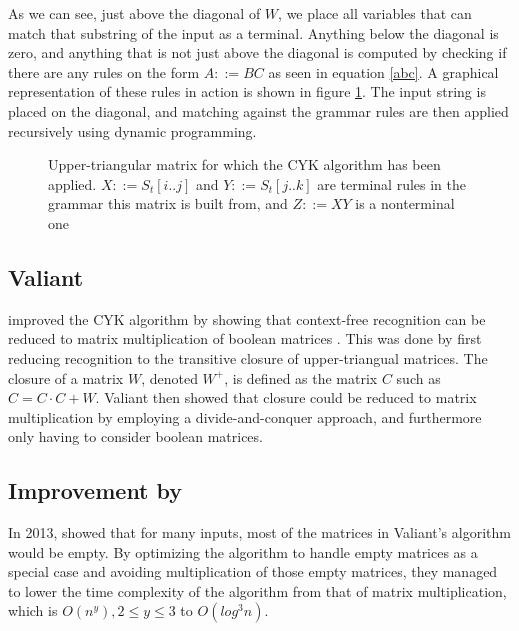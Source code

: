 \documentclass[a4paper,12pt,twosided]{report}
\renewcommand\cite{\citep}
\newcommand{\subt}[3] { 
  \draw[grid] (#1,#1) -- (#1,#2) node[inChart] {#3} -- (#2,#2);
  \fill[color=black] (#1,#2) circle (2pt)
 }
\newcommand{\mrk}[2]{\node[inChart] at (#1,#1) {#2}}
\begin{document}
As we can see, just above the diagonal of $W$, we place all variables that can
match that substring of the input as a terminal. Anything below the diagonal is
zero, and anything that is not just above the diagonal is computed by checking
if there are any rules on the form $A ::= BC$ as seen in equation \ref{abc}. A
graphical representation of these rules in action is shown in figure
\ref{exchart}. The input string is placed on the diagonal, and matching against
the grammar rules are then applied recursively using dynamic programming. 

\begin{figure}[H]
  \centering
  \caption{\label{exchart}Upper-triangular matrix for which the CYK algorithm
           has been applied. $X ::= S_t[i..j]$ and $Y ::= S_t[j..k]$ are
           terminal rules in the grammar this matrix is built from, and $Z
           ::= XY$ is a nonterminal one} 
\end{figure}

\subsection{Valiant}
\citet{Valiant75} improved the CYK algorithm by showing that
context-free recognition can be reduced to matrix multiplication of boolean
matrices \cite{Valiant75}. This was done by first reducing recognition to the
transitive closure of upper-triangual matrices.  The closure of a matrix $W$,
denoted $W^+$, is defined as the matrix $C$ such as $C = C \cdot C + W$.
Valiant then showed that closure could be reduced to matrix multiplication by
employing a divide-and-conquer approach, and furthermore only having to consider
boolean matrices. 

\subsection{Improvement by \citeauthor{parparsepaper}}
In 2013, \citet{parparsepaper} showed that for many inputs, most of the matrices
in Valiant's algorithm would be empty. By optimizing the algorithm to handle
empty matrices as a special case and avoiding multiplication of those empty
matrices, they managed to lower the time complexity of the algorithm from that
of matrix multiplication, which is $O(n^y), 2 \leq y \leq 3$ to $O(log^3 n)$. 
\end{document}
